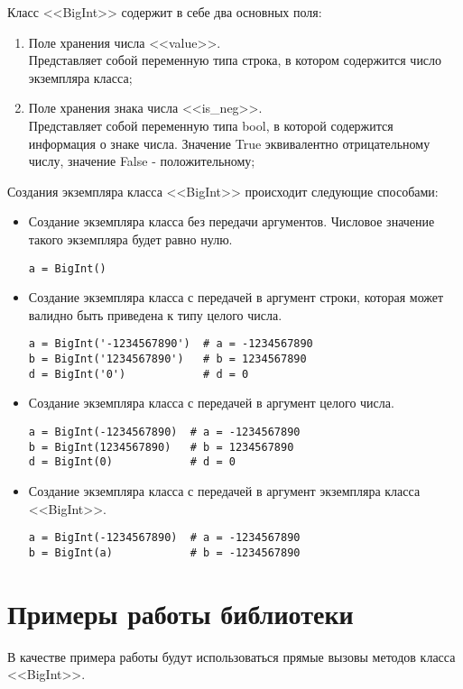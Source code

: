 Класс <<BigInt>> содержит в себе два основных поля:
\begin{enumerate}
    \item Поле хранения числа <<value>>.\\
    Представляет собой переменную типа строка, в котором содержится число экземпляра класса;
    \item Поле хранения знака числа <<is\_neg>>.\\
    Представляет собой переменную типа bool, в которой содержится информация о знаке числа.
    Значение True эквивалентно отрицательному числу, значение False - положительному;
\end{enumerate}

Создания экземпляра класса <<BigInt>> происходит следующие способами:
\begin{itemize}
    \item Создание экземпляра класса без передачи аргументов. Числовое значение такого экземпляра будет равно нулю.
    \begin{lstlisting}
a = BigInt()\end{lstlisting}
    \item Создание экземпляра класса с передачей в аргумент строки, которая может валидно быть приведена к типу целого числа.
    \begin{lstlisting}
a = BigInt('-1234567890')  # a = -1234567890
b = BigInt('1234567890')   # b = 1234567890
d = BigInt('0')            # d = 0\end{lstlisting}
    \item Создание экземпляра класса с передачей в аргумент целого числа.
    \begin{lstlisting}
a = BigInt(-1234567890)  # a = -1234567890
b = BigInt(1234567890)   # b = 1234567890
d = BigInt(0)            # d = 0\end{lstlisting}
    \item Создание экземпляра класса с передачей в аргумент экземпляра класса <<BigInt>>.
    \begin{lstlisting}
a = BigInt(-1234567890)  # a = -1234567890
b = BigInt(a)            # b = -1234567890\end{lstlisting}
\end{itemize}


\clearpage
\section{Примеры работы библиотеки}
В качестве примера работы будут использоваться прямые вызовы методов класса <<BigInt>>.

